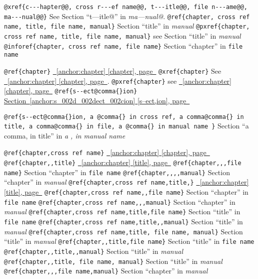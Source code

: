 \documentclass{book}
\begin{document}
\begin{titlepage}
\texttt{@xref\{c{-}{-}{-}hapter@@, cross r{-}{-}{-}ef name@@, t{-}{-}{-}itle@@, file n{-}{-}{-}ame@@, ma{-}{-}{-}nual@@\}} See Section ``t---itle@'' in \textsl{ma---nual@}.
\texttt{@ref\{chapter, cross ref name, title, file name, manual\}} Section ``title'' in \textsl{manual}
\texttt{@pxref\{chapter, cross ref name, title, file name, manual\}} see Section ``title'' in \textsl{manual}
\texttt{@inforef\{chapter, cross ref name, file name\}} Section ``chapter'' in \texttt{file name}

\texttt{@ref\{chapter\}} \hyperref[anchor:chapter]{\chaptername~\ref*{anchor:chapter} [chapter], page~\pageref*{anchor:chapter}}
\texttt{@xref\{chapter\}} See \hyperref[anchor:chapter]{\chaptername~\ref*{anchor:chapter} [chapter], page~\pageref*{anchor:chapter}}.
\texttt{@pxref\{chapter\}} see \hyperref[anchor:chapter]{\chaptername~\ref*{anchor:chapter} [chapter], page~\pageref*{anchor:chapter}}
\texttt{@ref\{s{-}{-}ect@comma\{\}ion\}} \hyperref[anchor:s_002d_002dect_002cion]{Section~\ref*{anchor:s_002d_002dect_002cion} [s--ect,ion], page~\pageref*{anchor:s_002d_002dect_002cion}}

\texttt{@ref\{s{-}{-}ect@comma\{\}ion, a @comma\{\} in cross
ref, a comma@comma\{\} in title, a comma@comma\{\} in file, a @comma\{\} in manual name \}}
Section ``a comma, in title'' in \textsl{a , in manual name}

\texttt{@ref\{chapter,cross ref name\}} \hyperref[anchor:chapter]{\chaptername~\ref*{anchor:chapter} [chapter], page~\pageref*{anchor:chapter}}
\texttt{@ref\{chapter,,title\}} \hyperref[anchor:chapter]{\chaptername~\ref*{anchor:chapter} [title], page~\pageref*{anchor:chapter}}
\texttt{@ref\{chapter,,,file name\}} Section ``chapter'' in \texttt{file name}
\texttt{@ref\{chapter,,,,manual\}} Section ``chapter'' in \textsl{manual}
\texttt{@ref\{chapter,cross ref name,title,\}} \hyperref[anchor:chapter]{\chaptername~\ref*{anchor:chapter} [title], page~\pageref*{anchor:chapter}}
\texttt{@ref\{chapter,cross ref name,,file name\}} Section ``chapter'' in \texttt{file name}
\texttt{@ref\{chapter,cross ref name,,,manual\}} Section ``chapter'' in \textsl{manual}
\texttt{@ref\{chapter,cross ref name,title,file name\}} Section ``title'' in \texttt{file name}
\texttt{@ref\{chapter,cross ref name,title,,manual\}} Section ``title'' in \textsl{manual}
\texttt{@ref\{chapter,cross ref name,title, file name, manual\}} Section ``title'' in \textsl{manual}
\texttt{@ref\{chapter,,title,file name\}} Section ``title'' in \texttt{file name}
\texttt{@ref\{chapter,,title,,manual\}} Section ``title'' in \textsl{manual}
\texttt{@ref\{chapter,,title, file name, manual\}} Section ``title'' in \textsl{manual}
\texttt{@ref\{chapter,,,file name,manual\}} Section ``chapter'' in \textsl{manual}



\end{titlepage}
\end{document}
